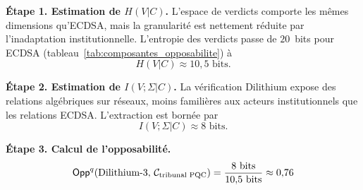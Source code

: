 \begin{sloppypar}
\noindent\textbf{\'Etape 1. Estimation de $H(V|C)$.} L'espace de verdicts
comporte les m\^emes dimensions qu'ECDSA, mais la granularit\'e est
nettement r\'eduite par l'inadaptation institutionnelle. L'entropie des verdicts passe
de $20$~bits pour ECDSA (tableau~\ref{tab:composantes_opposabilite}) \`a
\begin{equation}
H(V|C) \approx 10{,}5 \text{ bits}.
\label{eq:hvc_dilithium}
\end{equation}

\noindent\textbf{\'Etape 2. Estimation de $I(V;\Sigma|C)$.} La v\'erification
Dilithium expose des relations alg\'ebriques sur r\'eseaux, moins famili\`eres
aux acteurs institutionnels que les relations ECDSA. L'extraction est born\'ee
par
\begin{equation}
I(V;\Sigma|C) \approx 8 \text{ bits}.
\label{eq:ivc_dilithium}
\end{equation}

\noindent\textbf{\'Etape 3. Calcul de l'opposabilit\'e.}
\begin{equation}
\mathsf{Opp}^q(\text{Dilithium-3},\, \mathcal{C}_{\text{tribunal PQC}})
= \frac{8 \text{ bits}}{10{,}5 \text{ bits}} \approx 0{,}76
\label{eq:opp_q_dilithium}
\end{equation}


\end{sloppypar}
